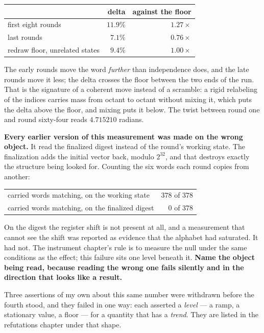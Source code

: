 \begin{center}
\begin{tabular}{lrr}
\toprule
 & delta & against the floor \\
\midrule
first eight rounds & \(11.9\%\) & \(1.27\times\) \\
last rounds & \(7.1\%\) & \(0.76\times\) \\
redraw floor, unrelated states & \(9.4\%\) & \(1.00\times\) \\
\bottomrule
\end{tabular}
\end{center}

The early rounds move the word \emph{further} than independence does, and the late rounds move it less; the delta crosses the floor between the two ends of the run. That is the signature of a coherent move instead of a scramble: a rigid relabeling of the indices carries mass from octant to octant without mixing it, which puts the delta above the floor, and mixing puts it below. The twist between round one and round sixty-four reads \(4.715210\) radians.

\textbf{Every earlier version of this measurement was made on the wrong object.} It read the finalized digest instead of the round's working state. The finalization adds the initial vector back, modulo \(2^{32}\), and that destroys exactly the structure being looked for. Counting the six words each round copies from another:

\begin{center}
\begin{tabular}{lr}
\toprule
carried words matching, on the working state & \(378\) of \(378\) \\
carried words matching, on the finalized digest & \(0\) of \(378\) \\
\bottomrule
\end{tabular}
\end{center}

On the digest the register shift is not present at all, and a measurement that cannot see the shift was reported as evidence that the alphabet had saturated. It had not. The instrument chapter's rule is to measure the null under the same conditions as the effect; this failure sits one level beneath it. \textbf{Name the object being read, because reading the wrong one fails silently and in the direction that looks like a result.}

Three assertions of my own about this same number were withdrawn before the fourth stood, and they failed in one way: each asserted a \emph{level} --- a ramp, a stationary value, a floor --- for a quantity that has a \emph{trend}. They are listed in the refutations chapter under that shape.

